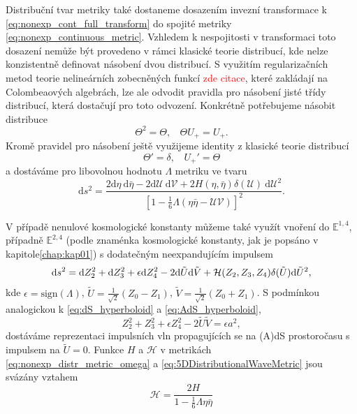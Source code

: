 Distribuční tvar metriky také dostaneme dosazením invezní transformace k \eqref{eq:nonexp_cont_full_transform} do spojité metriky 
\eqref{eq:nonexp_continuous_metric}. Vzhledem k nespojitosti v transformaci toto dosazení nemůže být provedeno
v rámci klasické teorie distribucí, kde nelze konzistentně definovat násobení dvou distribucí. S využitím regularizačních metod teorie
nelineárních zobecněných funkcí \textcolor{red}{zde citace}, které zakládají na Colombeaových algebrách, lze ale odvodit pravidla pro násobení
jisté třídy distribucí, která dostačují pro toto odvození. Konkrétně potřebujeme násobit distribuce
\begin{equation}
        \Theta^2 = \Theta, ~~~~ \Theta U_{+} = U_{+}.
\end{equation}
Kromě pravidel pro násobení ještě využijeme identity z klasické teorie distribucí
\begin{equation}
    \Theta' = \delta, ~~~~ U_{+}' = \Theta
\end{equation}
a dostáváme pro libovolnou hodnotu $\Lambda$ metriku ve tvaru
\begin{equation} \label{eq:nonexp_distr_metric_omega}
\mathrm{d}s^2=\frac{2\mathrm{d}\eta~\mathrm{d}\bar{\eta} - 2 \mathrm{d}\mathcal{U}~\mathrm{d}\mathcal{V} + 2H(\eta, \bar{\eta}) \delta(\mathcal{U}) 
~\mathrm{d}\mathcal{U}^2}{\left[1-\frac{1}{6}\Lambda(\eta \bar{\eta}-\mathcal{U}\mathcal{V})\right]^2}.
\end{equation}

V případě nenulové kosmologické konstanty můžeme také využít vnoření do $\mathbb{E}^{1,4}$, případně $\mathbb{E}^{2,4}$ (podle znaménka kosmologické
konstanty, jak je popsáno v kapitole\autoref{chap:kap01}) s dodatečným neexpandujícím impulsem
\begin{equation}
    \label{eq:5DDistributionalWaveMetric}
    \mathrm{d} s^2 = \mathrm{d} Z_2^2 + \mathrm{d} Z_3^2 + \epsilon \mathrm{d} Z_4^2 - 2 \mathrm{d} \tilde{U} \mathrm{d} \tilde{V} + \mathcal{H}(Z_2, Z_3, Z_4) \delta(\tilde{U}) \mathrm{d} \tilde{U}^2,
\end{equation}
kde $\epsilon = \text{sign} (\Lambda)$, $\tilde{U} = \tfrac{1}{\sqrt{2}}(Z_0 - Z_1)$, $\tilde{V}= \tfrac{1}{\sqrt{2}}(Z_0 + Z_1)$.
S podmínkou analogickou k \eqref{eq:dS_hyperboloid} a \eqref{eq:AdS_hyperboloid},
\begin{equation}
    Z_2^2 + Z_3^2 + \epsilon Z_4^2 - 2 \tilde{U} \tilde{V} = \epsilon a^2,
\end{equation}
dostáváme reprezentaci impulsních vln propagujících se na (A)dS prostoročasu s impulsem na $\tilde{U}=0$. 
Funkce $H$ a $\mathcal{H}$ v metrikách \eqref{eq:nonexp_distr_metric_omega} a \eqref{eq:5DDistributionalWaveMetric} jsou svázány vztahem
\begin{equation}
    \mathcal{H} = \frac{2H}{1-\frac{1}{6}\Lambda \eta \bar{\eta}}
\end{equation}



